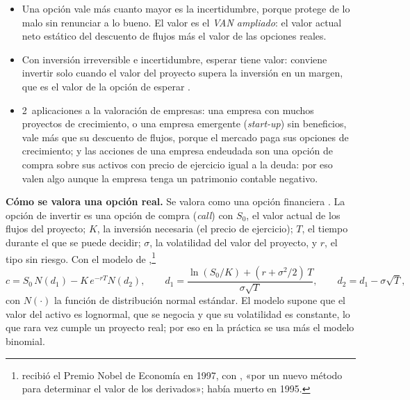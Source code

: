 \documentclass[11pt]{article}
\begin{document}
\begin{itemize}
  \begin{itemize}
  \item Una opción vale más cuanto mayor es la incertidumbre, porque protege de lo malo sin renunciar a lo bueno. El valor es el \emph{VAN ampliado}\nocite{Trigeorgis1996Real}: el valor actual neto estático del descuento de flujos más el valor de las opciones reales.
  \item Con inversión irreversible e incertidumbre, esperar tiene valor: conviene invertir solo cuando el valor del proyecto supera la inversión en un margen, que es el valor de la opción de esperar\nocite{DixitPindyck1994} .
  \item 2~aplicaciones a la valoración de empresas: una empresa con muchos proyectos de crecimiento, o una empresa emergente (\emph{start-up}) sin beneficios, vale más que su descuento de flujos, porque el mercado paga sus opciones de crecimiento; y las acciones de una empresa endeudada son una opción de compra sobre sus activos con precio de ejercicio igual a la deuda\nocite{Merton1974Pricing}: por eso valen algo aunque la empresa tenga un patrimonio contable negativo.
  \end{itemize}
\end{itemize}

\begin{anotaciones}
\textbf{Cómo se valora una opción real.} Se valora como una opción financiera . La opción de invertir es una opción de compra (\emph{call}) con $S_0$, el valor actual de los flujos del proyecto; $K$, la inversión necesaria (el precio de ejercicio); $T$, el tiempo durante el que se puede decidir; $\sigma$, la volatilidad del valor del proyecto, y $r$, el tipo sin riesgo. Con el modelo de \textcite{BlackScholes1973Pricing},\footnote{ recibió el Premio Nobel de Economía en 1997, con , «por un nuevo método para determinar el valor de los derivados»\nocite{Nobel1997Prensa};  había muerto en 1995.}
\[
c=S_0\,N(d_1)-K\,e^{-rT}N(d_2),\qquad d_1=\frac{\ln(S_0/K)+(r+\sigma^2/2)\,T}{\sigma\sqrt{T}},\qquad d_2=d_1-\sigma\sqrt{T},
\]
con $N(\cdot)$ la función de distribución normal estándar. El modelo supone que el valor del activo es lognormal, que se negocia y que su volatilidad es constante, lo que rara vez cumple un proyecto real; por eso en la práctica se usa más el modelo binomial\nocite{CoxRossRubinstein1979Option}.
\end{anotaciones}

\end{document}
